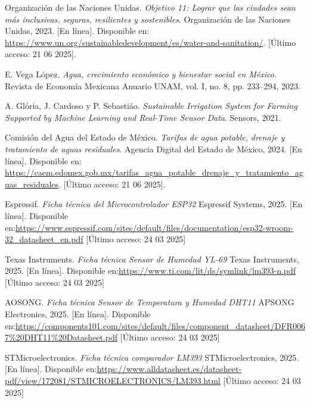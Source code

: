 \documentclass[pdflatex,sn-mathphys-num]{sn-jnl}%
\theoremstyle{thmstyleone}%
\theoremstyle{thmstyletwo}%
\theoremstyle{thmstylethree}%
\begin{document}
\begin{multicols}{2}
\begin{thebibliography}{4}


Organización de las Naciones Unidas.
\textit{Objetivo 11: Lograr que las ciudades sean más inclusivas, seguras, resilientes y sostenibles}.
Organización de las Naciones Unidas, 2023.
[En línea]. Disponible en: \url{https://www.un.org/sustainabledevelopment/es/water-and-sanitation/}.
[Último acceso: 21 06 2025].

E. Vega López.
\textit{Agua, crecimiento económico y bienestar social en México}.
Revista de Economía Mexicana Anuario UNAM, vol. I, no. 8, pp. 233–294, 2023.

A. Glória, J. Cardoso y P. Sebastiäo.
\textit{Sustainable Irrigation System for Farming Supported by Machine Learning and Real-Time Sensor Data}.
Sensors, 2021.

Comisión del Agua del Estado de México.
\textit{Tarifas de agua potable, drenaje y tratamiento de aguas residuales}.
Agencia Digital del Estado de México, 2024.
[En línea]. Disponible en: \url{https://caem.edomex.gob.mx/tarifas_agua_potable_drenaje_y_tratamiento_aguas_residuales}.
[Último acceso: 21 06 2025].


Espressif.
\textit{Ficha técnica del Microcontrolador ESP32}
Espressif Systems, 2025.
[En línea]. Disponible en:\url{https://www.espressif.com/sites/default/files/documentation/esp32-wroom-32_datasheet_en.pdf}
[Último acceso: 24 03 2025] 

Texas Instruments.
\textit{Ficha técnica Sensor de Humedad YL-69}
Texas Instruments, 2025.
[En línea]. Disponible en:\url{https://www.ti.com/lit/ds/symlink/lm393-n.pdf}
[Último acceso: 24 03 2025] 

AOSONG.
\textit{Ficha técnica Sensor de Temperatura y Humedad DHT11}
APSONG Electronics, 2025.
[En línea]. Disponible en:\url{https://components101.com/sites/default/files/component_datasheet/DFR0067%20DHT11%20Datasheet.pdf}
[Último acceso: 24 03 2025] 

STMicroelectronics.
\textit{Ficha técnica comparador LM393}
STMicroelectronics, 2025.
[En línea]. Disponible en:\url{https://www.alldatasheet.es/datasheet-pdf/view/172081/STMICROELECTRONICS/LM393.html}
[Último acceso: 24 03 2025] 


\end{thebibliography}
\end{multicols}
\end{document}
